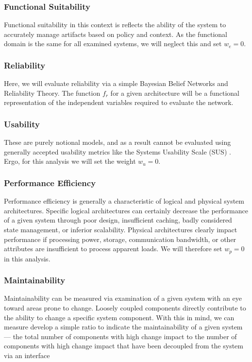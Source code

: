 \subsubsection*{Functional Suitability}
Functional suitability in this context is reflects the ability of the system to accurately manage artifacts based on policy and context.  As the functional domain is the same for all examined systems, we will neglect this and set $ w_{e} = 0 $.

\subsubsection*{Reliability}
Here, we will evaluate reliability via a simple Bayesian Belief Networks and Reliability Theory.  The function $ f_{r} $ for a given architecture will be a functional representation of the independent variables required to evaluate the network.

\subsubsection*{Usability}
These are purely notional models, and as a result cannot be evaluated using generally accepted usability metrics like the Systems Usability Scale (SUS) \cite{proposal:sus}.  Ergo, for this analysis we will set the weight $w_{u} = 0$.

\subsubsection*{Performance Efficiency}
Performance efficiency is generally a characteristic of logical and physical system architectures.  Specific logical architectures can certainly decrease the performance of a given system through poor design, insufficient caching, badly considered state management, or inferior scalability.  Physical architectures clearly impact performance if processing power, storage, communication bandwidth, or other attributes are insufficient to process apparent loads.  We will therefore set $w_{p} = 0$ in this analysis.

\subsubsection*{Maintainability}
Maintainability can be measured via examination of a given system with an eye toward areas prone to change.  Loosely coupled components directly contribute to the ability to change a specific system component.  With this in mind, we can measure develop a simple ratio to indicate the maintainability of a given system --- the total number of components with high change impact to the number of components with high change impact that have been decoupled from the system via an interface 

